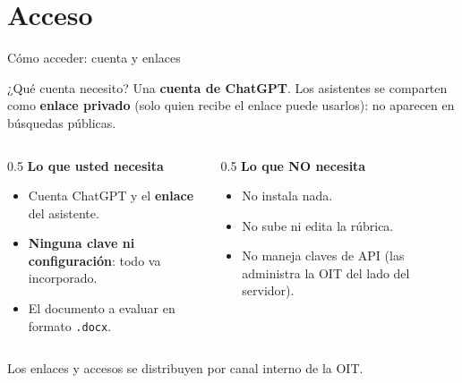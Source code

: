 \documentclass[aspectratio=169,11pt]{beamer}
\newcommand{\redlead}[1]{\textbf{\color{iloRed}#1}}
\newcommand{\bluelead}[1]{\textbf{\color{iloBlue}#1}}
\begin{document}
\section{Acceso}
\begin{frame}{Cómo acceder: cuenta y enlaces}
  \small
  \begin{block}{¿Qué cuenta necesito?}
    Una \bluelead{cuenta de ChatGPT}. Los asistentes se comparten como \bluelead{enlace privado} (solo quien recibe el enlace puede usarlos): no aparecen en búsquedas públicas.
  \end{block}
  \begin{columns}[T]
    \begin{column}{0.5\textwidth}
      \textbf{Lo que usted necesita}
      \begin{itemize}
        \item Cuenta ChatGPT y el \bluelead{enlace} del asistente.
        \item \redlead{Ninguna clave ni configuración}: todo va incorporado.
        \item El documento a evaluar en formato \texttt{.docx}.
      \end{itemize}
    \end{column}
    \begin{column}{0.5\textwidth}
      \textbf{Lo que NO necesita}
      \begin{itemize}
        \item No instala nada.
        \item No sube ni edita la rúbrica.
        \item No maneja claves de API (las administra la OIT del lado del servidor).
      \end{itemize}
    \end{column}
  \end{columns}
  \vspace{0.15cm}
  \centering\footnotesize\color{iloGray}Los enlaces y accesos se distribuyen por canal interno de la OIT.
\end{frame}

\end{document}

